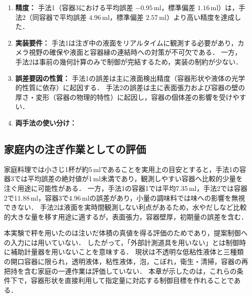 \begin{enumerate}
  \item \textbf{精度：}  
  手法1（容器3における平均誤差 $-0.95\,\mathrm{ml}$，標準偏差 $1.16\,\mathrm{ml}$）は，手法2（同容器で平均誤差 $4.96\,\mathrm{ml}$，標準偏差 $2.57\,\mathrm{ml}$）より高い精度を達成した．  
  \item \textbf{実装要件：}  
  手法1は注ぎ中の液面をリアルタイムに観測する必要があり，カメラ視野の確保や液面と容器縁の連結時への対策が不可欠である．  
  一方，手法2は事前の幾何計算のみで制御が完結するため，実装の制約が少ない．  
  \item \textbf{誤差要因の性質：}  
  手法1の誤差は主に液面検出精度（容器形状や液体の光学的性質に依存）に起因する．  
  手法2の誤差は主に表面張力および容器の壁の厚さ・変形（容器の物理的特性）に起因し，容器の個体差の影響を受けやすい．  
  \item \textbf{両手法の使い分け：}  
\end{enumerate}

\begin{revisionblock}
\subsection{家庭内の注ぎ作業としての評価}
家庭料理では小さじ1杯が約5\,mlであることを実用上の目安とすると，手法1の容器3では平均誤差の絶対値が1\,ml未満であり，観測しやすい容器へ比較的少量を注ぐ用途に可能性がある．
一方，手法1の容器1では平均7.35\,ml，手法2では容器2で11.88\,ml，容器3で4.96\,mlの誤差があり，小量の調味料では味への影響を無視できない．
手法2は液面を実時間観測しない利点があるため，水やだしなど比較的大きな量を移す用途に適するが，表面張力，容器壁厚，初期量の誤差を含む．

本実験で秤を用いたのは注いだ体積の真値を得る評価のためであり，提案制御への入力には用いていない．
したがって，「外部計測道具を用いない」とは制御時に補助計量器を用いないことを意味する．
現状は不透明な低粘性液体と三種類の開口容器に限られ，透明液体，粘性液体，泡，こぼれ，衛生・清掃，容器の再把持を含む家庭の一連作業は評価していない．
本章が示したのは，これらの条件下で，容器形状を直接利用して指定量に対応する制御目標を作れることである．
\end{revisionblock}


